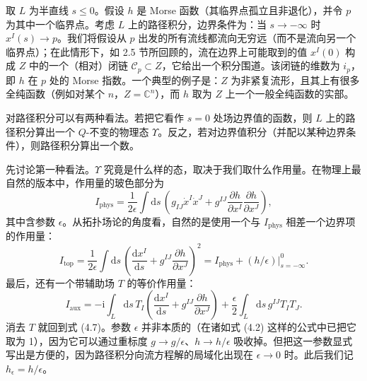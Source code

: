 \documentclass[11pt,a4paper,UTF8]{ctexart}
\theoremstyle{plain}
\theoremstyle{definition}
\begin{document}
取 $L$ 为半直线 $s\le 0$。假设 $h$ 是 Morse 函数（其临界点孤立且非退化），并令 $p$ 为其中一个临界点。考虑 $L$ 上的路径积分，边界条件为：当 $s\to-\infty$ 时 $x^I(s)\to p$。我们将假设从 $p$ 出发的所有流线都流向无穷远（而不是流向另一个临界点）；在此情形下，如 2.5 节所回顾的，流在边界上可能取到的值 $x^I(0)$ 构成 $Z$ 中的一个（相对）闭链 $\mathcal{C}_p\subset Z$，它给出一个积分围道。该闭链的维数为 $i_p$，即 $h$ 在 $p$ 处的 Morse 指数。一个典型的例子是：$Z$ 为非紧复流形，且其上有很多全纯函数（例如对某个 $n$，$Z=\mathbb{C}^n$），而 $h$ 取为 $Z$ 上一个一般全纯函数的实部。


对路径积分可以有两种看法。若把它看作 $s=0$ 处场边界值的函数，则 $L$ 上的路径积分算出一个 $Q$-不变的物理态 $\Upsilon$。反之，若对边界值积分（并配以某种边界条件），则路径积分算出一个数。

先讨论第一种看法。$\Upsilon$ 究竟是什么样的态，取决于我们取什么作用量。在物理上最自然的版本中，作用量的玻色部分为
\begin{equation}
    I_{\mathrm{phys}}=\frac{1}{2\epsilon}\int \mathrm{d}s\,
    \left(g_{IJ}\dot x^I\dot x^J
    +g^{IJ}\frac{\partial h}{\partial x^I}\frac{\partial h}{\partial x^J}\right),
    \tag{4.6}
\end{equation}
其中含参数 $\epsilon$。从拓扑场论的角度看，自然的是使用一个与 $I_{\mathrm{phys}}$ 相差一个边界项的作用量：
\begin{equation}
    I_{\mathrm{top}}=\frac{1}{2\epsilon}\int \mathrm{d}s\,
    \left(\frac{\mathrm{d}x^I}{\mathrm{d}s}
    +g^{IJ}\frac{\partial h}{\partial x^J}\right)^2
    =I_{\mathrm{phys}}+\left.(h/\epsilon)\right|^{0}_{s=-\infty}.
    \tag{4.7}
\end{equation}
最后，还有一个带辅助场 $T$ 的等价作用量：
\begin{equation}
    I_{\mathrm{aux}}=-\mathrm{i}\int_L \mathrm{d}s\,T_I
    \left(\frac{\mathrm{d}x^I}{\mathrm{d}s}
    +g^{IJ}\frac{\partial h}{\partial x^J}\right)
    +\frac{\epsilon}{2}\int_L \mathrm{d}s\,g^{IJ}T_I T_J.
    \tag{4.8}
\end{equation}
消去 $T$ 就回到式 (4.7)。参数 $\epsilon$ 并非本质的（在诸如式 (4.2) 这样的公式中已把它取为 1），因为它可以通过重标度 $g\to g/\epsilon$、$h\to h/\epsilon$ 吸收掉。但把这一参数显式写出是方便的，因为路径积分向流方程解的局域化出现在 $\epsilon\to 0$ 时。此后我们记 $h_\epsilon=h/\epsilon$。
\end{document}
